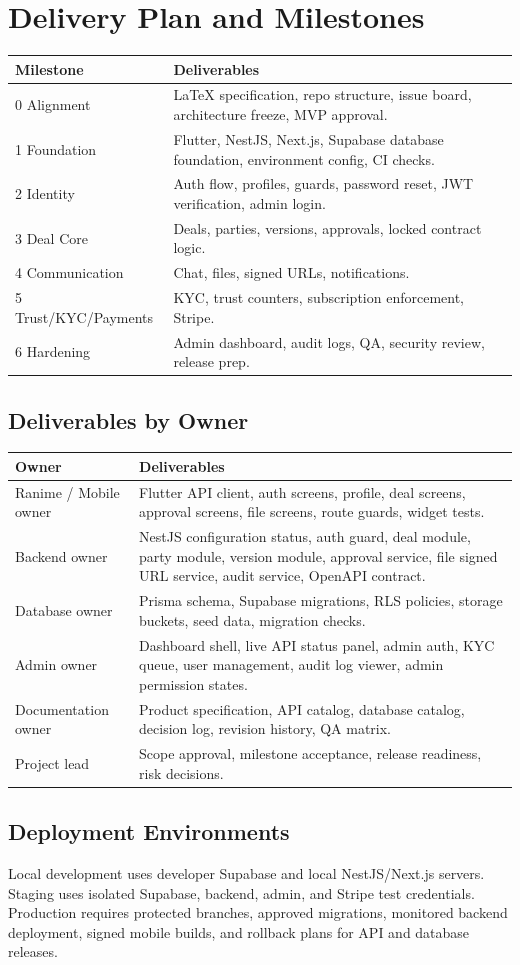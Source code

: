 \chapter{Delivery Plan and Milestones}
\begin{longtable}{p{}p{}}
\toprule
Milestone & Deliverables \\
\midrule
0 Alignment & LaTeX specification, repo structure, issue board, architecture freeze, MVP approval. \\
1 Foundation & Flutter, NestJS, Next.js, Supabase database foundation, environment config, CI checks. \\
2 Identity & Auth flow, profiles, guards, password reset, JWT verification, admin login. \\
3 Deal Core & Deals, parties, versions, approvals, locked contract logic. \\
4 Communication & Chat, files, signed URLs, notifications. \\
5 Trust/KYC/Payments & KYC, trust counters, subscription enforcement, Stripe. \\
6 Hardening & Admin dashboard, audit logs, QA, security review, release prep. \\
\bottomrule
\end{longtable}

\section{Deliverables by Owner}
\begin{longtable}{p{}p{}}
\toprule
Owner & Deliverables \\
\midrule
Ranime / Mobile owner & Flutter API client, auth screens, profile, deal screens, approval screens, file screens, route guards, widget tests. \\
Backend owner & NestJS configuration status, auth guard, deal module, party module, version module, approval service, file signed URL service, audit service, OpenAPI contract. \\
Database owner & Prisma schema, Supabase migrations, RLS policies, storage buckets, seed data, migration checks. \\
Admin owner & Dashboard shell, live API status panel, admin auth, KYC queue, user management, audit log viewer, admin permission states. \\
Documentation owner & Product specification, API catalog, database catalog, decision log, revision history, QA matrix. \\
Project lead & Scope approval, milestone acceptance, release readiness, risk decisions. \\
\bottomrule
\end{longtable}

\section{Deployment Environments}
Local development uses developer Supabase and local NestJS/Next.js servers. Staging uses isolated Supabase, backend, admin, and Stripe test credentials. Production requires protected branches, approved migrations, monitored backend deployment, signed mobile builds, and rollback plans for API and database releases.
